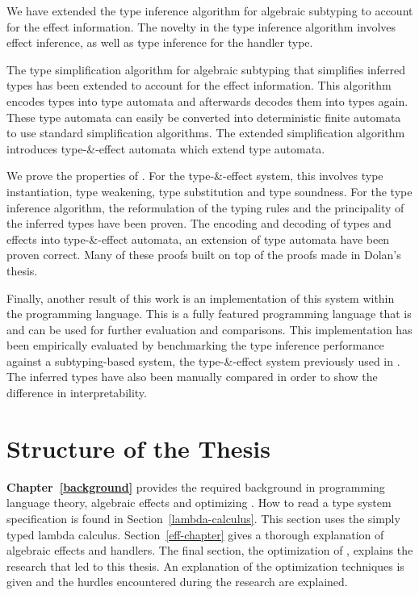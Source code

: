 We have extended the type inference algorithm for algebraic subtyping to account for the effect information. The novelty in the type inference algorithm involves effect inference, as well as type inference for the handler type.

The type simplification algorithm for algebraic subtyping that simplifies inferred types has been extended to account for the effect information. This algorithm encodes types into type automata and afterwards decodes them into types again. These type automata can easily be converted into deterministic finite automata to use standard simplification algorithms. The extended simplification algorithm introduces type-\&-effect automata which extend type automata.

We prove the properties of \core. For the type-\&-effect system, this involves type instantiation, type weakening, type substitution and type soundness. For the type inference algorithm, the reformulation of the typing rules and the principality of the inferred types have been proven. The encoding and decoding of types and effects into type-\&-effect automata, an extension of type automata have been proven correct. Many of these proofs built on top of the proofs made in Dolan's thesis.

Finally, another result of this work is an implementation of this system within the \eff programming language. This is a fully featured programming language that is and can be used for further evaluation and comparisons. This implementation has been empirically evaluated by benchmarking the type inference performance against a subtyping-based system, the type-\&-effect system previously used in \eff. The inferred types have also been manually compared in order to show the difference in interpretability. 

\section{Structure of the Thesis}
\textbf{Chapter~\ref{background}} provides the required background in programming language theory, algebraic effects and optimizing \eff. How to read a type system specification is found in Section~\ref{lambda-calculus}. This section uses the simply typed lambda calculus. Section~\ref{eff-chapter} gives a thorough explanation of algebraic effects and handlers. The final section, the optimization of \eff, explains the research that led to this thesis. An explanation of the optimization techniques is given and the hurdles encountered during the research are explained. 

